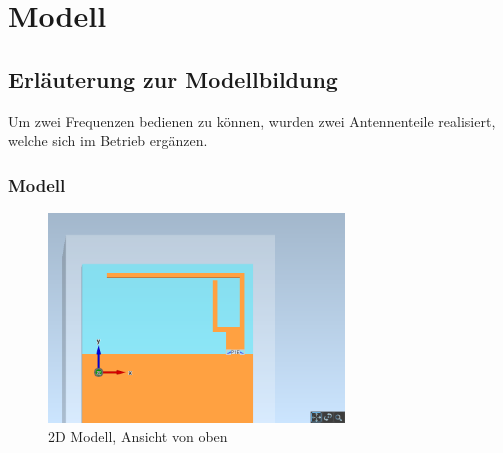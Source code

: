 \section{Modell}
\subsection{Erläuterung zur Modellbildung}
Um zwei Frequenzen bedienen zu können, wurden zwei Antennenteile realisiert, welche sich im Betrieb ergänzen.



\subsubsection{Modell}

\begin{figure}[h!]
	\centering
	\includegraphics[width=0.7\textwidth]{../fig/plt/crazy_stuff_l4_pcb_v2c_laptop_1a_105_5ghz_3d_pcb_xy.png}
	\caption{2D Modell, Ansicht von oben}
\end{figure}


